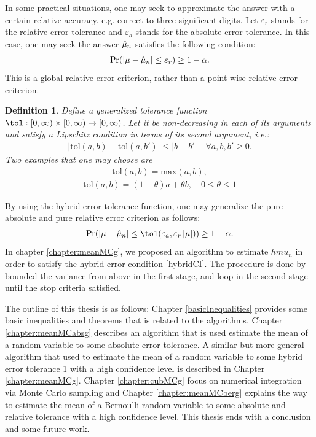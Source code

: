\documentclass{iitthesis}
\newtheorem{defn}{Definition}[theorem]
\begin{document}
In some practical situations, one may seek to approximate the answer with a certain relative accuracy. e.g. correct to three significant digits. Let $\varepsilon_r$ stands for the relative error tolerance and $\varepsilon_a$ stands for the absolute error tolerance. In this case, one may seek the answer $\hat{\mu}_n$ satisfies the following condition:
\begin{align}\label{relCI}
\Pr(\left \lvert \mu-\hat{\mu}_n \right \rvert\leq \varepsilon_r) \geq 1-\alpha.
\end{align}
This is a global relative error criterion, rather than a point-wise relative error criterion. 
\begin{defn}\label{def:tolfun}
 Define a generalized tolerance function $\tol: [0, \infty) \times [0, \infty) \to [0,\infty)$. Let it be non-decreasing in each of its arguments and satisfy a Lipschitz condition in terms of its second argument, i.e.:
\begin{align}
|\text{tol}(a,b)-\text{tol}(a,b')| \leq |b-b'| \quad \forall a,b,b' \geq 0.
\end{align}
Two examples that one may choose are
\begin{align}
\text{tol}(a,b) = \text{max} (a,b),
\end{align}
\begin{align}
\text{tol}(a,b) = (1- \theta) a + \theta b, \quad 0 \leq \theta \leq 1
\end{align}
\end{defn}
By using the hybrid error tolerance function, one may generalize the pure absolute and pure relative error criterion as follows:
\begin{align}\label{hybridCI}
\Pr(\abs{\mu-\hmu_n}\leq \tol(\varepsilon_a, \varepsilon_r\abs{\mu})) \geq 1-\alpha.
\end{align}
In chapter \ref{chapter:meanMCg}, we proposed an algorithm to estimate $hmu_n$ in order to satisfy the hybrid error condition \eqref{hybridCI}. The procedure is done by bounded the variance from above in the first stage, and loop in the second stage until the stop criteria satisfied.

The outline of this thesis is as follows:  Chapter \ref{basicInequalities} provides some basic inequalities and theorems that is related to the algorithms. Chapter \ref{chapter:meanMCabsg} describes an algorithm that is used estimate the mean of a random variable to some absolute error tolerance. A similar but more general algorithm that used to estimate the mean of a random variable to some hybrid error tolerance \ref{def:tolfun} with a high confidence level is described in Chapter \ref{chapter:meanMCg}. Chapter \ref{chapter:cubMCg} focus on numerical integration via Monte Carlo sampling and 
Chapter \ref{chapter:meanMCberg} explains the way to estimate the mean of a Bernoulli random variable to some absolute and relative tolerance with a high confidence level. This thesis ends with a conclusion and some future work.
\end{document}
